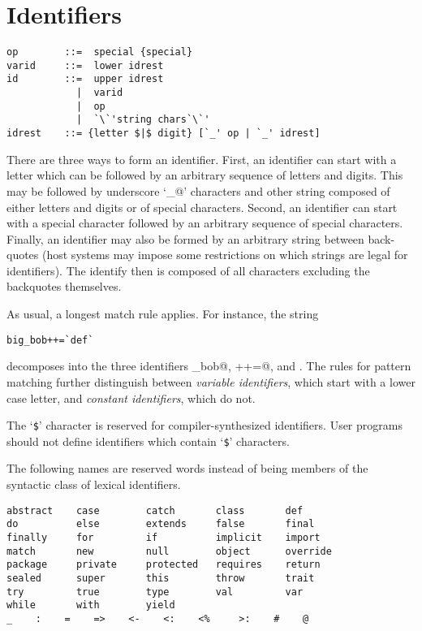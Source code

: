 \section{Identifiers}\label{sec:idents}

\syntax\begin{lstlisting}
op        ::=  special {special}
varid     ::=  lower idrest
id        ::=  upper idrest
            |  varid
            |  op
            |  `\`'string chars`\`'
idrest    ::= {letter $|$ digit} [`_' op | `_' idrest]
\end{lstlisting}

There are three ways to form an identifier. First, an identifier can
start with a letter which can be followed by an arbitrary sequence of
letters and digits. This may be followed by underscore `\lstinline@_@'
characters and other string composed of either letters and digits or
of special characters.  Second, an identifier can start with a special
character followed by an arbitrary sequence of special characters.
Finally, an identifier may also be formed by an arbitrary string
between back-quotes (host systems may impose some restrictions on
which strings are legal for identifiers).  The identify then is
composed of all characters excluding the backquotes themselves. 
 
As usual, a longest match rule applies. For instance, the string

\begin{lstlisting}
big_bob++=`def`
\end{lstlisting}

decomposes into the three identifiers \lstinline@big_bob@, \lstinline@++=@, and
.  The rules for pattern matching further distinguish between
{\em variable identifiers}, which start with a lower case letter, and
{\em constant identifiers}, which do not.


The `\lstinline[mathescape=false]@$@'\comment{$} character is reserved
for compiler-synthesized identifiers.  User programs should not define
identifiers which contain `\lstinline[mathescape=false]@$@'\comment{$}
characters.

The following names are reserved words instead of being members of the
syntactic class  of lexical identifiers.

\begin{lstlisting}
abstract    case        catch       class       def    
do          else        extends     false       final    
finally     for         if          implicit    import      
match       new         null        object      override    
package     private     protected   requires    return      
sealed      super       this        throw       trait
try         true        type        val         var         
while       with        yield
_    :    =    =>    <-    <:    <%     >:    #    @
\end{lstlisting}

